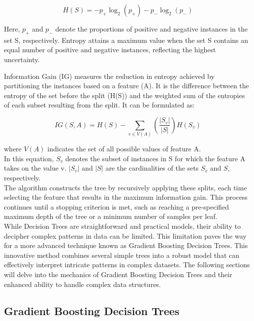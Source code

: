 \begin{equation}
	H(S) = - p_{+} \log_{2}(p_{+}) - p_{-} \log_{2}(p_{-})
\end{equation}

Here, $p_+$ and $p_-$ denote the proportions of positive and negative instances in the set S, respectively. Entropy attains a maximum value when the set S contains an equal number of positive and negative instances, reflecting the highest uncertainty.

Information Gain (IG) measures the reduction in entropy achieved by partitioning the instances based on a feature (A). It is the difference between the entropy of the set before the split (H(S)) and the weighted sum of the entropies of each subset resulting from the split. It can be formulated as:

\begin{equation}
	IG(S, A) = H(S) - \sum_{v \in V(A)} \left(\frac{|S_v|}{|S|}\right) H(S_v)
\end{equation}

where $V(A)$ indicates the set of all possible values of feature A.\\
In this equation, $S_v$ denotes the subset of instances in S for which the feature A takes on the value v. $|S_v|$ and $|S|$ are the cardinalities of the sets $S_v$ and $S$, respectively.\\

The algorithm constructs the tree by recursively applying these splits, each time selecting the feature that results in the maximum information gain. This process continues until a stopping criterion is met, such as reaching a pre-specified maximum depth of the tree or a minimum number of samples per leaf.\\


While Decision Trees are straightforward and practical models, their ability to decipher complex patterns in data can be limited. This limitation paves the way for a more advanced technique known as Gradient Boosting Decision Trees. This innovative method combines several simple trees into a robust model that can effectively interpret intricate patterns in complex datasets. The following sections will delve into the mechanics of Gradient Boosting Decision Trees and their enhanced ability to handle complex data structures.

\subsection{Gradient Boosting Decision Trees}

